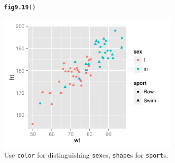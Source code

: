 \documentclass[12pt, a4paper,  BCOR=8.25mm, DIV=15]{scrartcl}\usepackage[]{graphicx}\usepackage[]{color}
\makeatletter
\newcommand{\hlstd}[1]{\textcolor[rgb]{0.345,0.345,0.345}{#1}}%
\newcommand{\hlkwd}[1]{\textcolor[rgb]{0.737,0.353,0.396}{\textbf{#1}}}%
\newenvironment{kframe}{%
 \def\at@end@of@kframe{}%
 \ifinner\ifhmode%
  \def\at@end@of@kframe{\end{minipage}}%
  \begin{minipage}{\columnwidth}%
 \fi\fi%
 \def\FrameCommand##1{\hskip\@totalleftmargin \hskip-\fboxsep
 \colorbox{shadecolor}{##1}\hskip-\fboxsep
     \hskip-\linewidth \hskip-\@totalleftmargin \hskip\columnwidth}%
 \MakeFramed {\advance\hsize-\width
   \@totalleftmargin\z@ \linewidth\hsize
   \@setminipage}}%
 {\par\unskip\endMakeFramed%
 \at@end@of@kframe}
\newenvironment{knitrout}{}{} %
\makeatother
\begin{document}
\begin{figure}[ht]
\begin{knitrout}
\color{fgcolor}\begin{kframe}
\begin{alltt}
\hlkwd{fig9.19}\hlstd{()}
\end{alltt}
\end{kframe}

{\centering \includegraphics[width=0.8\textwidth]{figs/gph-fig9_19e-1} 

}



\end{knitrout}
\caption{Use \texttt{color} for distinguishing \texttt{sex}es,
\texttt{shape}s for \texttt{sport}s.}\label{fig:colshape}
\end{figure}
\end{document}

